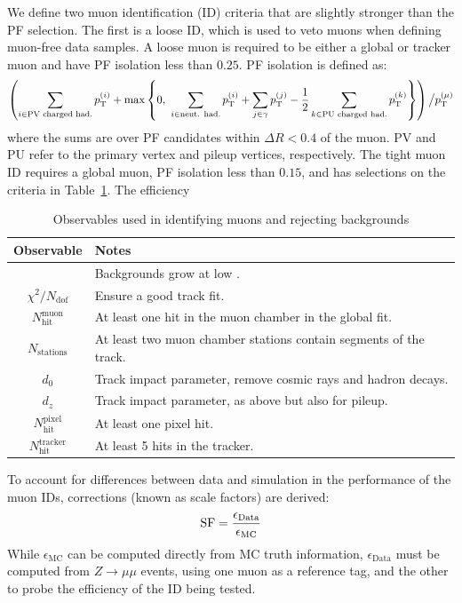 We define two muon identification (ID) criteria that are slightly stronger than the PF selection. 
The first is a loose ID, which is used to veto muons when defining muon-free data samples.
A loose muon is required to be either a global or tracker muon and have PF isolation less than $0.25$.
PF isolation is defined as:
\begin{equation}
	\left(\sum_{i \in \text{PV charged had.}} p_\mathrm{T}^{(i)} +
	\max\left\{0,~\sum_{i\in\text{neut. had.}} p_\mathrm{T}^{(i)} + \sum_{j\in\gamma} p_\mathrm{T}^{(j)} - 
			\frac{1}{2} \sum_{k\in\text{PU charged had.}}p_\mathrm{T}^{(k)}\right\} \right)
	\big/ p_\mathrm{T}^{(\mu)}
\end{equation}
where the sums are over PF candidates within $\Delta R < 0.4$ of the muon.
PV and PU refer to the primary vertex and pileup vertices, respectively.
The tight muon ID requires a global muon, PF isolation less than $0.15$, and has selections on the criteria in Table~\ref{tab:cms:muon}.
The efficiency

\begin{table}
	\begin{center}
		\caption{Observables used in identifying muons and rejecting backgrounds}
		\label{tab:cms:muon}
		\begin{tabular}{c|p{}}
			Observable & Notes \\ 
			\hline
			\hline
			\pt & Backgrounds grow at low \pt. \\ \hline
			$\chi^2/N_\mathrm{dof}$ & Ensure a good track fit. \\ \hline
			$N_\mathrm{hit}^\mathrm{muon}$ & At least one hit in the muon chamber in the global fit. \\ \hline
			$N_\mathrm{stations}$ & At least two muon chamber stations contain segments of the track. \\ \hline
			$d_0$ & Track impact parameter, remove cosmic rays and hadron decays. \\ \hline
			$d_z$ & Track impact parameter, as above but also for pileup. \\ \hline
			$N_\mathrm{hit}^\mathrm{pixel}$ & At least one pixel hit. \\ \hline
			$N_\mathrm{hit}^\mathrm{tracker}$ & At least 5 hits in the tracker. \\ 
		\end{tabular}
	\end{center}
\end{table}

To account for differences between data and simulation in the performance of the muon IDs, corrections (known as scale factors) are derived:
\begin{equation}
	\mathrm{SF} = \frac{\epsilon_\mathrm{Data}}{\epsilon_\mathrm{MC}}
\end{equation}
While $\epsilon_\mathrm{MC}$ can be computed directly from MC truth information, $\epsilon_\mathrm{Data}$ must be computed from $Z\rightarrow \mu\mu$ events, using one muon as a reference tag, and the other to probe the efficiency of the ID being tested.

